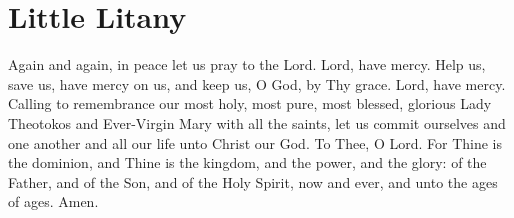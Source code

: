 \section{Little Litany}

\begin{liturgicaltext}
    \deacon Again and again, in peace let us pray to the Lord.
    \choir Lord, have mercy.
    \deacon Help us, save us, have mercy on us, and keep us, O God, by Thy grace.
    \choir Lord, have mercy.
    \deacon Calling to remembrance our most holy, most pure, most blessed, glorious Lady Theotokos and Ever-Virgin Mary with all the saints, let us commit ourselves and one another and all our life unto Christ our God.
    \choir To Thee, O Lord.
    \priest For Thine is the dominion, and Thine is the kingdom, and the power, and the glory: of the Father, and of the Son, and of the Holy Spirit, now and ever, and unto the ages of ages.
    \choir Amen.
\end{liturgicaltext}




